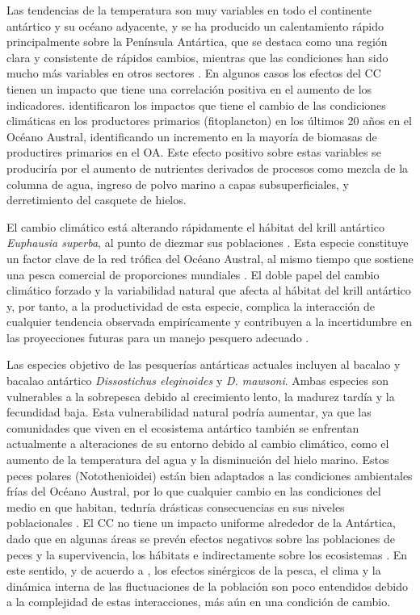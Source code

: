 \documentclass{umagthesis}
\begin{document}
Las tendencias de la temperatura son muy variables en todo el continente antártico y su océano adyacente, y se ha producido un calentamiento rápido principalmente sobre la Península Antártica, que se destaca como una región clara y consistente de rápidos cambios, mientras que las condiciones han sido mucho más variables en otros sectores \autocite{Turner2005}. En algunos casos los efectos del CC tienen un impacto que tiene una correlación positiva en el aumento de los indicadores. \autocite{Pinkerton2021} identificaron los impactos que tiene el cambio de las condiciones climáticas en los productores primarios (fitoplancton) en los últimos 20 años en el Océano Austral, identificando un incremento en la mayoría de biomasas de productires primarios en el OA. Este efecto positivo sobre estas variables se produciría por el aumento de nutrientes derivados de procesos como mezcla de la columna de agua, ingreso de polvo marino a capas subsuperficiales, y derretimiento del casquete de hielos.

El cambio climático está alterando rápidamente el hábitat del krill antártico \emph{Euphausia superba}, al punto de diezmar sus poblaciones \autocite{Kruger2021}. Esta especie constituye un factor clave de la red trófica del Océano Austral, al mismo tiempo que sostiene una pesca comercial de proporciones mundiales \autocite{Atkinson2009}. El doble papel del cambio climático forzado y la variabilidad natural que afecta al hábitat del krill antártico y, por tanto, a la productividad de esta especie, complica la interacción de cualquier tendencia observada empirícamente y contribuyen a la incertidumbre en las proyecciones futuras para un manejo pesquero adecuado \autocite{Sylvester2021}.

Las especies objetivo de las pesquerías antárticas actuales incluyen al bacalao y bacalao antártico \emph{Dissostichus eleginoides} y \emph{D. mawsoni}. Ambas especies son vulnerables a la sobrepesca debido al crecimiento lento, la madurez tardía y la fecundidad baja. Esta vulnerabilidad natural podría aumentar, ya que las comunidades que viven en el ecosistema antártico también se enfrentan actualmente a alteraciones de su entorno debido al cambio climático, como el aumento de la temperatura del agua y la disminución del hielo marino. Estos peces polares (Notothenioidei) están bien adaptados a las condiciones ambientales frías del Océano Austral, por lo que cualquier cambio en las condiciones del medio en que habitan, tednría drásticas consecuencias en sus niveles poblacionales \autocite{Mintenbeck2017}. El CC no tiene un impacto uniforme alrededor de la Antártica, dado que en algunas áreas se prevén efectos negativos sobre las poblaciones de peces y la supervivencia, los hábitats e indirectamente sobre los ecosistemas \autocite{Vanderhaven2013}. En este sentido, y de acuerdo a \autocite{Hidalgo2018}, los efectos sinérgicos de la pesca, el clima y la dinámica interna de las fluctuaciones de la población son poco entendidos debido a la complejidad de estas interacciones, más aún en una condición de cambio.
\end{document}

